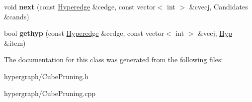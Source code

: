 \begin{DoxyCompactItemize}
\item 
\hypertarget{class_cube_pruning_a5d3ab59862953b9000154e9c07c69634}{
void {\bfseries next} (const \hyperlink{class_scarab_1_1_h_g_1_1_hyperedge}{Hyperedge} \&cedge, const vector$<$ int $>$ \&cvecj, Candidates \&cands)}
\label{class_cube_pruning_a5d3ab59862953b9000154e9c07c69634}

\item 
\hypertarget{class_cube_pruning_aa7d26357be4241b594f9eb24ac52da22}{
bool {\bfseries gethyp} (const \hyperlink{class_scarab_1_1_h_g_1_1_hyperedge}{Hyperedge} \&cedge, const vector$<$ int $>$ \&vecj, \hyperlink{struct_hyp}{Hyp} \&item)}
\label{class_cube_pruning_aa7d26357be4241b594f9eb24ac52da22}

\end{DoxyCompactItemize}


The documentation for this class was generated from the following files:\begin{DoxyCompactItemize}
\item 
hypergraph/CubePruning.h\item 
hypergraph/CubePruning.cpp\end{DoxyCompactItemize}
